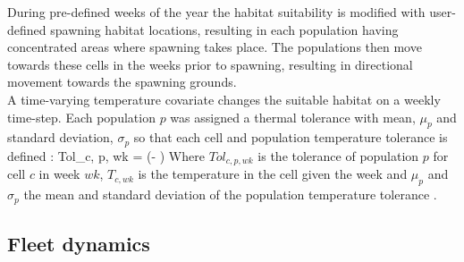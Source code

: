 \documentclass[review]{elsarticle}
\let\oldequation\equation
\let\oldendequation\endequation
\renewenvironment{equation}
 {\linenomathNonumbers\oldequation}
 {\oldendequation\endlinenomath}
\begin{document}
During pre-defined weeks of the year the habitat suitability is modified with
user-defined spawning habitat locations, resulting in each population having
concentrated areas where spawning takes place. The populations then move
towards these cells in the weeks prior to spawning, resulting in directional
movement towards the spawning grounds. \\

A time-varying temperature covariate changes the 
suitable habitat on a weekly time-step. Each population $p$ was assigned a
thermal tolerance with mean, $\mu_{p}$ and standard deviation, $\sigma_{p}$ so that
each cell and population temperature tolerance is defined :
\begin{equation}
	Tol_{c, p, wk} =   \exp \left(-
		 \right)	
\end{equation}
Where $Tol_{c, p, wk}$ is the tolerance of population $p$ for cell $c$ in week
$wk$, $T_{c, wk}$ is the temperature in the cell given the week and $\mu_{p}$
and $\sigma_{p}$ the mean and standard deviation of the population temperature
tolerance . \\


\subsection{Fleet dynamics}
\end{document}
